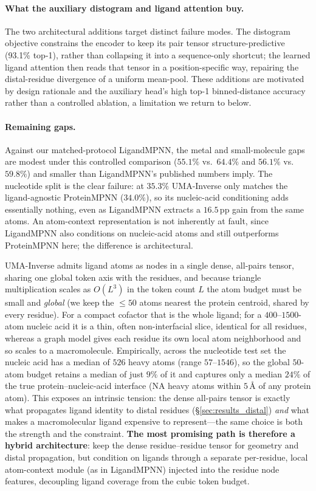 \documentclass[11pt,letterpaper]{article}
\begin{document}
\paragraph{What the auxiliary distogram and ligand attention buy.}
The two architectural additions target distinct failure modes. The distogram objective constrains the
encoder to keep its pair tensor structure-predictive (93.1\% top-1), rather than collapsing
it into a sequence-only shortcut; the learned ligand attention then reads that tensor in a
position-specific way, repairing the distal-residue divergence of a uniform mean-pool. These additions
are motivated by design rationale and the auxiliary head's high top-1 binned-distance accuracy rather
than a controlled ablation, a limitation we return to below.

\paragraph{Remaining gaps.}
Against our matched-protocol LigandMPNN, the metal and small-molecule gaps are modest under this
controlled comparison ($55.1\%$ vs.\ $64.4\%$ and $56.1\%$ vs.\ $59.8\%$) and smaller than LigandMPNN's
published numbers imply. The nucleotide split is the clear failure: at $35.3\%$ UMA-Inverse only matches
the ligand-agnostic ProteinMPNN ($34.0\%$), so its nucleic-acid conditioning adds essentially
nothing, even as LigandMPNN extracts a $16.5$\,pp gain from the same atoms.
An atom-context representation is not inherently at fault, since LigandMPNN also conditions on
nucleic-acid atoms and still outperforms ProteinMPNN here; the difference is architectural.

UMA-Inverse admits
ligand atoms as nodes in a single dense, all-pairs tensor, sharing one global token axis with the
residues, and because triangle multiplication scales as $O(L^3)$ in the token count $L$ the atom budget
must be small and \emph{global} (we keep the $\leq 50$ atoms nearest the protein centroid, shared by
every residue). For a compact cofactor that is the whole ligand; for a $400$--$1500$-atom nucleic acid
it is a thin, often non-interfacial slice, identical for all residues, whereas a graph model gives
each residue its own local atom neighborhood and so scales to a macromolecule. Empirically, across the
nucleotide test set the nucleic acid has a median of $526$ heavy atoms (range $57$--$1546$), so the
global $50$-atom budget retains a median of just $9\%$ of it and captures only a median $24\%$ of the
true protein--nucleic-acid interface (NA heavy atoms within $5$\,{\AA} of any protein atom). This exposes an
intrinsic tension: the dense all-pairs tensor is exactly what propagates ligand identity to distal
residues (\S\ref{sec:results_distal}) \emph{and} what makes a macromolecular ligand expensive to
represent---the same choice is both the strength and the constraint. \textbf{The most promising path is
therefore a hybrid architecture}: keep the dense residue--residue tensor for geometry and distal
propagation, but condition on ligands through a separate per-residue, local atom-context module (as in
LigandMPNN) injected into the residue node features, decoupling ligand coverage from the cubic token
budget.
\end{document}
